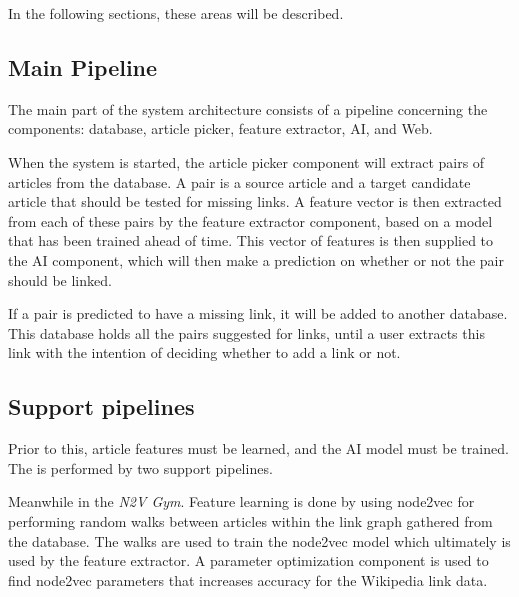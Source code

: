 In the following sections, these areas will be described.

\subsection{Main Pipeline}
The main part of the system architecture consists of a pipeline concerning the components: database, article picker, feature extractor, AI, and Web.

When the system is started, the article picker component will extract pairs of articles from the database. A pair is a source article and a target candidate article that should be tested for missing links. A feature vector is then extracted from each of these pairs by the feature extractor component, based on a model that has been trained ahead of time. This vector of features is then supplied to the AI component, which will then make a prediction on whether or not the pair should be linked.

If a pair is predicted to have a missing link, it will be added to another database. This database holds all the pairs suggested for links, until a user extracts this link with the intention of deciding whether to add a link or not.


\subsection{Support pipelines}
Prior to this, article features must be learned, and the AI model must be trained. The is performed by two support pipelines.

Meanwhile in the \textit{N2V Gym\texttrademark}. Feature learning is done by using node2vec for performing random walks between articles within the link graph gathered from the database. The walks are used to train the node2vec model which ultimately is used by the feature extractor.
A parameter optimization component is used to find node2vec parameters that increases accuracy for the Wikipedia link data.

